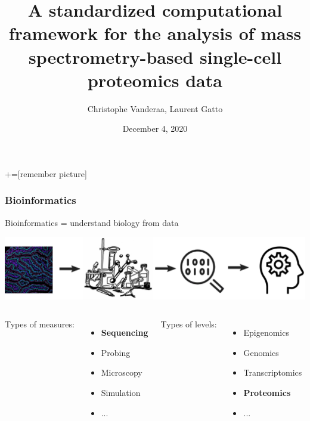 \documentclass{beamer}
\title{A standardized computational framework for the analysis of mass 
spectrometry-based single-cell proteomics data}
\author[]{Christophe Vanderaa, Laurent Gatto}
\date{December 4, 2020}
\begin{document}
+=[remember picture]

\begin{frame}[plain]
\titlepage
\end{frame}

\begin{frame}[c]
  \frametitle{Bioinformatics}
  
  Bioinformatics = understand biology from data
  
  \vfill
  \includegraphics[width=\linewidth]{figs/bioinformatics.pdf}
  
  \vfill
  \begin{columns}
    Types of measures: 
    \begin{itemize}
      \item \textbf<2>{Sequencing}
      \item Probing
      \item Microscopy 
      \item Simulation
      \item ...
    \end{itemize}
    Types of levels: 
    \begin{itemize}
      \item Epigenomics
      \item Genomics
      \item Transcriptomics
      \item \textbf<2>{Proteomics}
      \item ...
    \end{itemize}
  \end{columns}
  
\end{frame}
\end{document}
